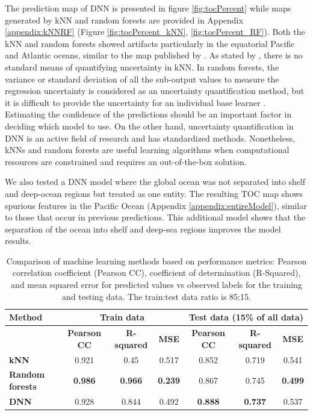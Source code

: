 \documentclass[journal abbreviation, manuscript]{copernicus}
\begin{document}
The prediction map of DNN is presented in figure \ref{fig:tocPercent} while maps generated by kNN and random forests are provided in Appendix \ref{appendix:kNNRF} (Figure \ref{fig:tocPercent_kNN}, \ref{fig:tocPercent_RF}). Both the kNN and random forests showed artifacts particularly in the equatorial Pacific and Atlantic oceans, similar to the map published by \cite{LeeTOCkNN}. As stated by \cite{LeeTOCkNN}, there is no standard means of quantifying uncertainty in kNN. In random forests, the variance or standard deviation of all the sub-output values to measure the regression uncertainty is considered as an uncertainty quantification method, but it is difficult to provide the uncertainty for an individual base learner \citep{Mentch2016}. Estimating the confidence of the predictions should be an important factor in deciding which model to use. On the other hand, uncertainty quantification in DNN is an active field of research and has standardized methods. Nonetheless, kNNs and random forests are useful learning algorithms when computational resources are constrained and requires an out-of-the-box solution.

We also tested a DNN model where the global ocean was not separated into shelf and deep-ocean regions but treated as one entity. The resulting TOC map shows spurious features in the Pacific Ocean (Appendix \ref{appendix:entireModel}), similar to those that occur in previous predictions. This additional model shows that the separation of the ocean into shelf and deep-sea regions improves the model results. 


\begin{table}[h]
  \centering
  \begin{tabular}{|l|c|c|c|c|c|c|}
    \hline
    \textbf{Method} & \multicolumn{3}{c|}{\textbf{Train data}} & \multicolumn{3}{c|}{\textbf{Test data (15\% of all data)}} \\
    \hline
           & \textbf{Pearson CC} & \textbf{R-squared} & \textbf{MSE} & \textbf{Pearson CC} & \textbf{R-squared} & \textbf{MSE}\\
    \hline
    \textbf{kNN} & 0.921& 0.45& 0.517& 0.852& 0.719& 0.541\\
    \hline
    \textbf{Random forests} & \textbf{0.986} & \textbf{ 0.966} & \textbf{0.239} &  0.867& 0.745& \textbf{0.499}\\
    \hline
    \textbf{DNN} & 0.928 & 0.844& 0.492& \textbf{0.888}&\textbf{ 0.737}& 0.537\\
    \hline
  \end{tabular}
    \caption{Comparison of machine learning methods based on performance metrics: Pearson correlation coefficient (Pearson CC), coefficient of determination (R-Squared), and mean squared error for predicted values vs observed labels for the training and testing data. The train:test data ratio is 85:15.}
  \label{tab:kNNRF}
\end{table}
\end{document}
